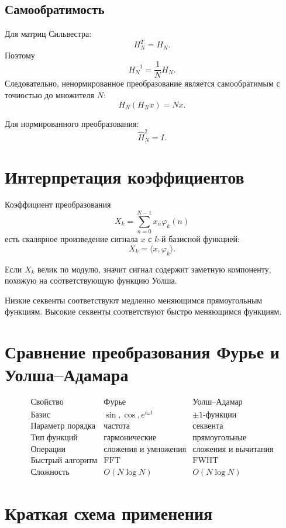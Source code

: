 \documentclass[12pt,a4paper]{article}
\begin{document}
\subsection{Самообратимость}

Для матриц Сильвестра:
\[
    H_N^T=H_N.
\]
Поэтому
\[
    H_N^{-1}=\frac{1}{N}H_N.
\]
Следовательно, ненормированное преобразование является самообратимым с точностью до множителя $N$:
\[
    H_N(H_Nx)=N x.
\]

Для нормированного преобразования:
\[
    \widehat{H}_N^2=I.
\]

\section{Интерпретация коэффициентов}

Коэффициент преобразования
\[
    X_k=\sum_{n=0}^{N-1}x_n\varphi_k(n)
\]
есть скалярное произведение сигнала $x$ с $k$-й базисной функцией:
\[
    X_k=\langle x,\varphi_k\rangle.
\]

Если $X_k$ велик по модулю, значит сигнал содержит заметную компоненту, похожую на соответствующую функцию Уолша.

Низкие секвенты соответствуют медленно меняющимся прямоугольным функциям. Высокие секвенты соответствуют быстро меняющимся функциям.

\section{Сравнение преобразования Фурье и Уолша--Адамара}

\[
\begin{array}{c|c|c}
\text{Свойство} & \text{Фурье} & \text{Уолш--Адамар}\\
\hline
\text{Базис} & \sin,\cos,e^{i\omega t} & \pm 1\text{-функции}\\
\text{Параметр порядка} & \text{частота} & \text{секвента}\\
\text{Тип функций} & \text{гармонические} & \text{прямоугольные}\\
\text{Операции} & \text{сложения и умножения} & \text{сложения и вычитания}\\
\text{Быстрый алгоритм} & \text{FFT} & \text{FWHT}\\
\text{Сложность} & O(N\log N) & O(N\log N)
\end{array}
\]

\section{Краткая схема применения}
\end{document}
